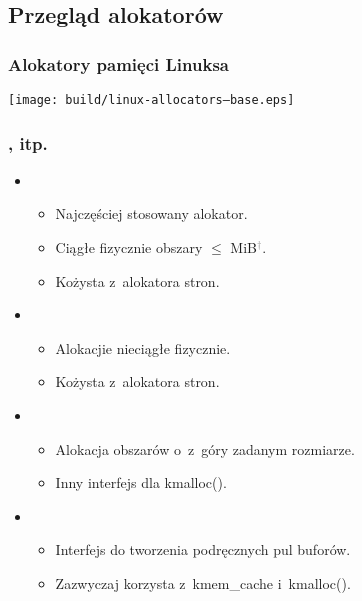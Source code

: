
\subsection{Przegląd alokatorów}

\begin{frame}
  \frametitle{Alokatory pamięci Linuksa}

  \begin{center}
    \texttt{[image: build/linux-allocators--base.eps]}
  \end{center}
\end{frame}

\begin{frame}
  \frametitle{,  itp.}

  \begin{itemize}
  \item {}
    \begin{itemize}
    \item Najczęściej stosowany alokator.
    \item Ciągłe fizycznie obszary $\le$
      \unit[4]{MiB}\textcolor{gray}{$^\dagger$}.
    \item Kożysta z~alokatora stron.
    \end{itemize}

  \item {}
    \begin{itemize}
    \item Alokacjie nieciągłe fizycznie.
    \item Kożysta z~alokatora stron.
    \end{itemize}

  \item {}
    \begin{itemize}
    \item Alokacja obszarów o~z~góry zadanym rozmiarze.
    \item Inny interfejs dla kmalloc().
    \end{itemize}

  \item {}
    \begin{itemize}
    \item Interfejs do tworzenia podręcznych pul buforów.
    \item Zazwyczaj korzysta z~kmem\_cache i~kmalloc().
    \end{itemize}
  \end{itemize}
\end{frame}

